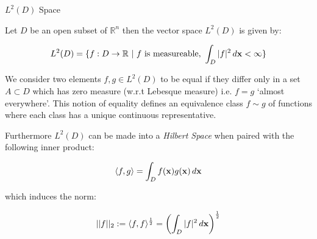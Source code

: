 \begin{definition}\label{def:L2-D}
    $L^2(D)$ Space

    Let $D$ be an open subset of $\mathbb{R}^n$ then the vector space $L^2(D)$ is
    given by:

    \begin{equation}\label{eq:L2-D}
        L^2(D) = \{f: D \rightarrow \mathbb{R}\ |\ f \text{ is measureable, }
                    \int_D|f|^2\, d\mathbf{x} < \infty\}
    \end{equation}

    We consider two elements $f,g \in L^2(D)$ to be equal if they
    differ only in a set $A \subset D$ which has zero measure (w.r.t Lebesque
    measure) i.e. $f = g$ `almost everywhere'. This notion of equality
    defines an equivalence class $f \sim g$ of functions where each class has a
    unique continuous representative.

    Furthermore $L^2(D)$ can be made into a \textit{Hilbert Space} when paired
    with the following inner product:

    \begin{equation}\label{eq:L2-D-inner-product}
        \langle f,g \rangle = \int_Df(\mathbf{x})g(\mathbf{x})\, d\mathbf{x}
    \end{equation}

    which induces the norm:

    \begin{equation}\label{eq:L2-D-norm}
        ||f||_2 := \langle f, f\rangle^{\frac{1}{2}}
                 = \left(\int_D|f|^2\, d\mathbf{x}\right)^{\frac{1}{2}}
    \end{equation}

\end{definition}

